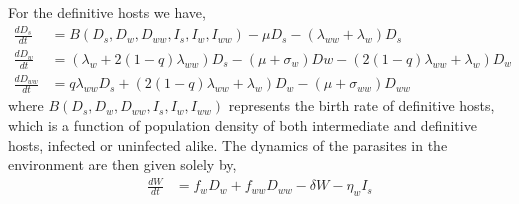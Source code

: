 \documentclass{article}
\begin{document}
For the definitive hosts we have,
\begin{align}
\frac{dD_s}{dt} &= B(D_s,  D_w,  D_{ww},  I_s, I_w, I_{ww})  - \mu D_s - (\lambda_{ww} + \lambda_w) D_s \nonumber \\    
\frac{dD_w}{dt} &= (\lambda_w + 2 (1 - q) \lambda_{ww}) D_s - (\mu + \sigma_w) Dw - (2 (1 - q) \lambda_{ww} + \lambda_w) D_w  \label{odes:dhosts} \\         
\frac{dD_{ww}}{dt} &= q \lambda_{ww} D_s + (2 (1 - q) \lambda_{ww} + \lambda_w) D_w - (\mu + \sigma_{ww}) D_{ww} \nonumber
\end{align}
%
where $B(D_s, D_w, D_{ww}, I_s, I_w, I_{ww})$ represents the birth rate of definitive hosts, which is a function of population density of both intermediate and definitive hosts, infected or uninfected alike. 
The dynamics of the parasites in the environment are then given solely by,
\begin{align}
	\frac{dW}{dt} &= f_w D_w + f_{ww} D_{ww} - \delta W - \eta_w I_s \label{odes:eparasite}
\end{align}
\end{document}
